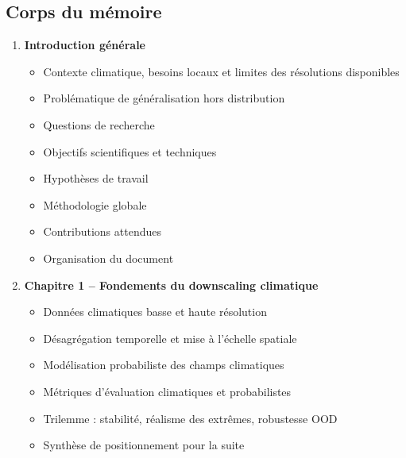\documentclass[12pt,a4paper]{article}
\begin{document}
\subsection*{Corps du m\'emoire}
\begin{enumerate}
    \item \textbf{Introduction g\'en\'erale}
    \begin{itemize}
        \item Contexte climatique, besoins locaux et limites des r\'esolutions disponibles
        \item Probl\'ematique de g\'en\'eralisation hors distribution
        \item Questions de recherche
        \item Objectifs scientifiques et techniques
        \item Hypoth\`eses de travail
        \item M\'ethodologie globale
        \item Contributions attendues
        \item Organisation du document
    \end{itemize}

    \item \textbf{Chapitre 1 -- Fondements du downscaling climatique}
    \begin{itemize}
        \item Donn\'ees climatiques basse et haute r\'esolution
        \item D\'esagr\'egation temporelle et mise \`a l'\'echelle spatiale
        \item Mod\'elisation probabiliste des champs climatiques
        \item M\'etriques d'\'evaluation climatiques et probabilistes
        \item Trilemme : stabilit\'e, r\'ealisme des extr\^emes, robustesse OOD
        \item Synth\`ese de positionnement pour la suite
    \end{itemize}


\end{enumerate}
\end{document}
